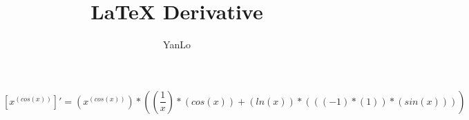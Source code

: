 \documentclass{article}
\title{LaTeX Derivative}
\author{YanLo}
\begin{document}
\maketitle

\fontsize{14}{10pt}\selectfont
\begin{equation}
\left[{{{x}}^{\left(cos\left({x}\right)\right)}}\right]' = {\left({{{x}}^{\left(cos\left({x}\right)\right)}}\right)*\left({{\left({\frac{{1}}{{x}}}\right)*\left(cos\left({x}\right)\right)}+{\left(ln\left({x}\right)\right)*\left({\left({\left({-1}\right)*\left({1}\right)}\right)*\left(sin\left({x}\right)\right)}\right)}}\right)}
\end{equation}
\end{document}
